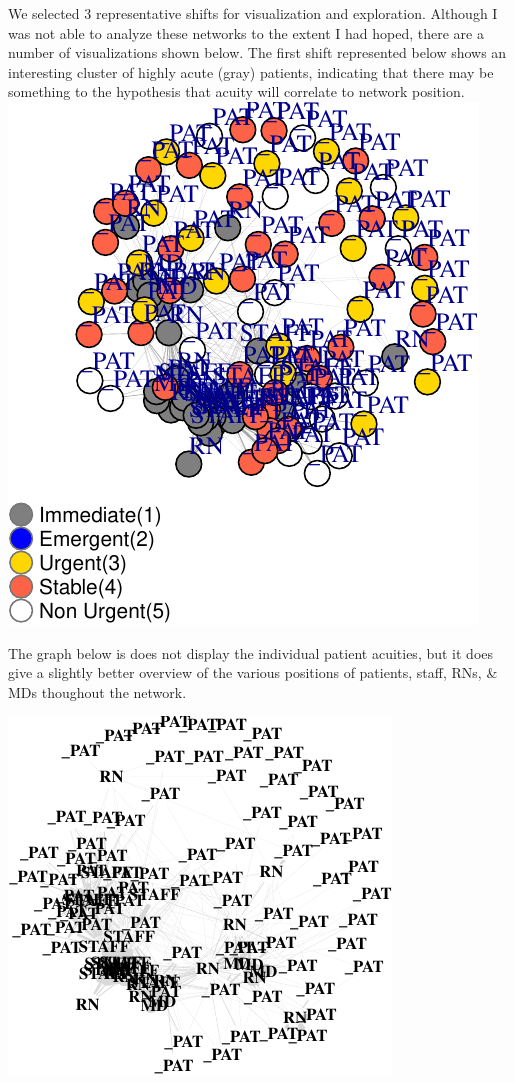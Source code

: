 \documentclass[]{elsarticle} %
\makeatletter
\def\maxwidth{\ifdim\Gin@nat@width>\linewidth\linewidth
\else\Gin@nat@width\fi}
\let\Oldincludegraphics\includegraphics
\renewcommand{\includegraphics}[1]{\Oldincludegraphics[width=\maxwidth]{#1}}
\makeatother
\begin{document}
We selected 3 representative shifts for visualization and exploration.
Although I was not able to analyze these networks to the extent I had
hoped, there are a number of visualizations shown below. The first shift
represented below shows an interesting cluster of highly acute (gray)
patients, indicating that there may be something to the hypothesis that
acuity will correlate to network position.
\includegraphics{Flynn_Project_files/figure-latex/shift 10-1.pdf}

The graph below is does not display the individual patient acuities, but
it does give a slightly better overview of the various positions of
patients, staff, RNs, \& MDs thoughout the network.

\includegraphics{Flynn_Project_files/figure-latex/shift10 labels-1.pdf}
\end{document}
